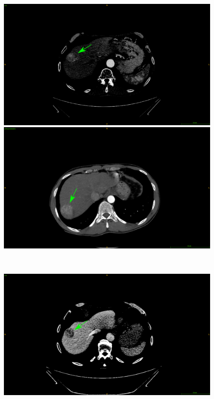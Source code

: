 \begin{figure}[!ht]
	\centering
	\begin{minipage}{0.45\linewidth}
		\includegraphics[width=\linewidth]{../Contributions/images/ImagingTraits/ResizeGDB_washin}
	\end{minipage} \hspace{-0.1cm}
	\begin{minipage}{0.45\linewidth}
		\includegraphics[width=\linewidth]{../Contributions/images/ImagingTraits/ResizeTCIA_washin}
	\end{minipage} \\
	\begin{minipage}{0.45\linewidth}
		\includegraphics[width=\linewidth]{../Contributions/images/ImagingTraits/ResizeGDB_washout}

\end{minipage}
\end{figure}
